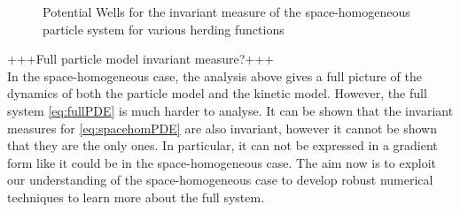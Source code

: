         \begin{figure}[h!]
            \centering
            \caption[Potential Wells]{Potential Wells for the invariant measure of the space-homogeneous particle system for various herding functions}
            \label{fig:spacehomparticlemeasure}
        \end{figure}
        +++Full particle model invariant measure?+++\\
        In the space-homogeneous case, the analysis above gives a full picture of the dynamics of both the particle model and the kinetic model. However, the full system \eqref{eq:fullPDE} is much harder to analyse. It can be shown that the invariant measures for \eqref{eq:spacehomPDE} are also invariant, however it cannot be shown that they are the only ones. In particular, it can not be expressed in a gradient form like it could be in the space-homogeneous case. The aim now is to exploit our understanding of the space-homogeneous case to develop robust numerical techniques to learn more about the full system.
